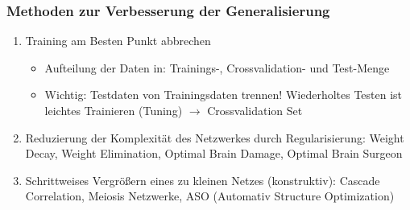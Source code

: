 \subsubsection*{Methoden zur Verbesserung der Generalisierung}

\begin{enumerate}
\item Training am Besten Punkt abbrechen
\begin{itemize}
\item Aufteilung der Daten in: Trainings-, Crossvalidation- und Test-Menge
\item Wichtig: Testdaten von Trainingsdaten trennen! Wiederholtes Testen ist leichtes Trainieren (Tuning) $\to$ Crossvalidation Set
\end{itemize}
\item Reduzierung der Komplexität des Netzwerkes durch Regularisierung: Weight Decay, Weight Elimination, Optimal Brain Damage, Optimal Brain Surgeon
\item Schrittweises Vergrößern eines zu kleinen Netzes (konstruktiv): Cascade Correlation, Meiosis Netzwerke, ASO (Automativ Structure Optimization)
\end{enumerate}














